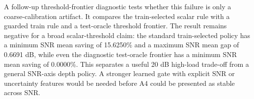 A follow-up threshold-frontier diagnostic tests whether this failure is only a coarse-calibration artifact. It compares the train-selected scalar rule with a guarded train rule and a test-oracle threshold frontier. The result remains negative for a broad scalar-threshold claim: the standard train-selected policy has a minimum SNR mean saving of 15.6250\% and a maximum SNR mean gap of 0.6691 dB, while even the diagnostic test-oracle frontier has a minimum SNR mean saving of 0.0000\%. This separates a useful 20 dB high-load trade-off from a general SNR-axis depth policy. A stronger learned gate with explicit SNR or uncertainty features would be needed before A4 could be presented as stable across SNR.
